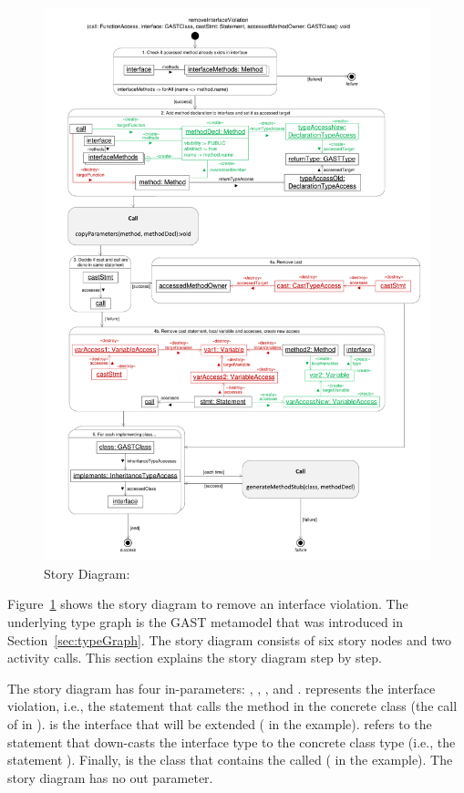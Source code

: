\begin{figure}[hbtp]
\centering
\includegraphics[width=\linewidth]{./figures/SDRemoveInterfaceViolation}
\caption{Story Diagram: }
\label{fig:SDRemoveInterfaceViolation}
\end{figure}

Figure~\ref{fig:SDRemoveInterfaceViolation} shows the story diagram to remove an interface violation. The underlying type graph is the GAST metamodel that was introduced in Section~\ref{sec:typeGraph}. The story diagram consists of six story nodes and two activity calls. This section explains the story diagram step by step.

The story diagram has four in-parameters: , , , and .  represents the interface violation, i.e., the statement that calls the method in the concrete class (the call of  in ).  is the interface that will be extended ( in the example).  refers to the statement that down-casts the interface type to the concrete class type (i.e., the statement ). Finally,  is the class that contains the called  ( in the example). The story diagram has no out parameter.

